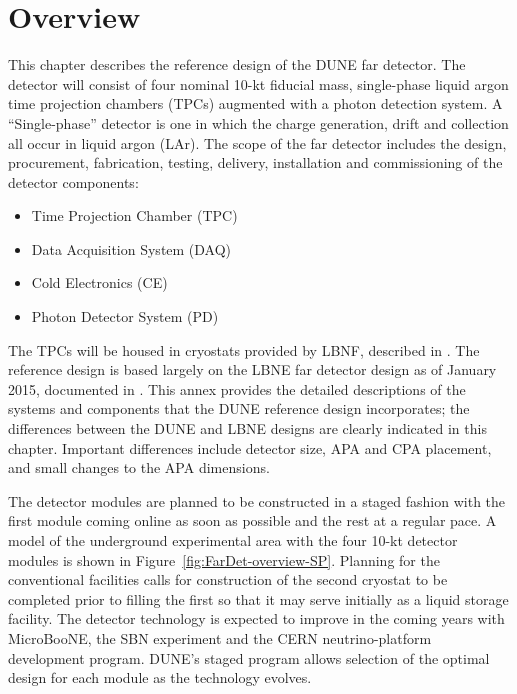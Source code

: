 \section{Overview}
\label{sec:detectors-fd-ref-ov}


This chapter describes the reference design of the DUNE far detector.  The detector will consist of four nominal 10-kt fiducial mass, single-phase liquid argon time projection chambers (TPCs) augmented with a photon detection system.  A ``Single-phase'' detector is one in which the charge generation, drift and collection all occur in liquid argon (LAr). The scope of the far detector includes the design, procurement, fabrication, testing, delivery, installation and commissioning of the detector components: 

\begin{itemize}
\item Time Projection Chamber (TPC)
\item Data Acquisition System (DAQ)  
\item Cold Electronics (CE)
\item Photon Detector System (PD)
\end{itemize}
The TPCs will be housed in cryostats provided by LBNF, described in \vollbnf. The reference design is based largely on the LBNE far detector design as of January 2015, documented in \anxlbnefd. This annex provides the detailed descriptions of the systems and components that the DUNE reference design incorporates; the differences between the DUNE and LBNE designs are clearly indicated in this chapter. Important differences include detector size, APA and CPA placement, and small changes to the APA dimensions.


The detector modules are planned to be constructed in a staged fashion with the first module coming online as soon as possible and the rest at a regular pace. A model of the underground experimental area with the four 10-kt detector modules is shown in Figure~\ref{fig:FarDet-overview-SP}. Planning for the conventional facilities calls for construction of the second cryostat to be completed prior to filling the first so that it may serve initially as a liquid storage facility. 
The detector technology is expected to improve in the coming years with MicroBooNE, the SBN experiment and the CERN neutrino-platform development program. DUNE's staged program allows selection of the optimal design for each module as the technology evolves.  %

